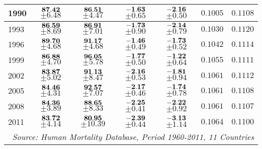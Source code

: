 \documentclass[10pt, titlepage]{article}%
\begin{document}
\begin{table}
\begin{tabular}{||l|c|c|c|c|c|c||}
  1990 &  $\bf 87.42$ $\pm 6.48$& $\bf 86.51$ $\pm 4.47$& $\bf -1.63$ $\pm 0.65$& $\bf -2.16$ $\pm 0.50$&  $0.1005$&  $0.1108$ \\ \hline\hline
  1993 &  $\bf 86.59$ $\pm 8.69$& $\bf 86.91$ $\pm 7.01$& $\bf -1.73$ $\pm 0.90$& $\bf -2.14$ $\pm 0.79$&  $0.1030$&  $0.1120$ \\ \hline\hline
  1996 &  $\bf 89.70$ $\pm 4.68$& $\bf 91.17$ $\pm 4.68$& $\bf -1.46$ $\pm 0.49$& $\bf -1.73$ $\pm 0.52$&  $0.1042$&  $0.1114$ \\ \hline\hline
  1999 &  $\bf 86.88$ $\pm 4.70$& $\bf 96.05$ $\pm 5.78$& $\bf -1.77$ $\pm 0.50$& $\bf -1.22$ $\pm 0.64$&  $0.1055$&  $0.1111$ \\ \hline\hline
  2002 &  $\bf 83.87$ $\pm 5.02$& $\bf 91.13$ $\pm 8.47$& $\bf -2.16$ $\pm 0.53$& $\bf -1.81$ $\pm 0.94$&  $0.1061$&  $0.1112$ \\ \hline\hline
  2005 &  $\bf 84.46$ $\pm 4.31$& $\bf 92.57$ $\pm 7.07$& $\bf -2.17$ $\pm 0.46$& $\bf -1.74$ $\pm 0.78$&  $0.1061$&  $0.1108$ \\ \hline\hline
  2008 &  $\bf 84.36$ $\pm 3.89$& $\bf 88.65$ $\pm 8.33$& $\bf -2.25$ $\pm 0.41$& $\bf -2.22$ $\pm 0.92$&  $0.1061$&  $0.1107$ \\ \hline\hline
  2011 &  $\bf 83.72$ $\pm 4.14$& $\bf 80.95$ $\pm 10.39$& $\bf -2.39$ $\pm 0.44$& $\bf -3.13$ $\pm 1.14$&  $0.1064$&  $0.1100$ \\ \hline\hline
        
\multicolumn{7}{||r||}{{\em Source: Human Mortality Database, Period 1960-2011, 11 Countries}} \\ \hline\hline
\end{tabular}
\label{table5a}
\end{table}
\end{document}
